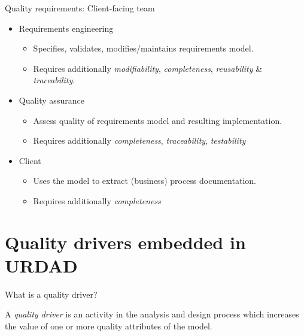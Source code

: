 \documentclass[a4]{article}
\begin{document}
\begin{frame}{Quality requirements: Client-facing team}
  \begin{itemize} 
    \item<+-| alert@+> Requirements engineering
      \begin{itemize}
	\item Specifies, validates, modifies/maintains requirements model.
	\item Requires additionally {\em modifiability}, {\em completeness}, {\em reusability} \& {\em traceability}.
      \end{itemize}
    \item<+-| alert@+> Quality assurance
      \begin{itemize}
	\item Assess quality of requirements model and resulting implementation.
	\item Requires additionally {\em completeness}, {\em traceability}, {\em testability}
      \end{itemize}
    \item<+-| alert@+> Client
      \begin{itemize}
	\item Uses the model to extract (business) process documentation.
	\item Requires additionally {\em completeness}
      \end{itemize}
  \end{itemize}
\end{frame}


\section{Quality drivers embedded in URDAD}

\begin{frame}{What is a quality driver?}
  \begin{definition}
    A {\em quality driver} is an activity in the analysis and design process which increases the value of one or more quality attributes of the model.
  \end{definition}
\end{frame}


\end{document}
